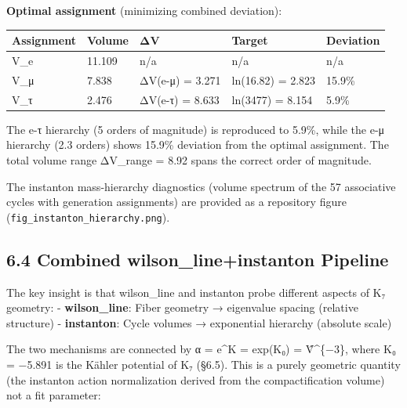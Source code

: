 \documentclass[11pt,a4paper]{article}
\begin{document}
\textbf{Optimal assignment} (minimizing combined deviation):

\begin{longtable}[]{@{}lllll@{}}
\toprule\noalign{}
Assignment & Volume & ΔV & Target & Deviation \\
\midrule\noalign{}
\endhead
\bottomrule\noalign{}
\endlastfoot
V\_\allowbreak{}e & 11.109 & n/a & n/a & n/a \\
V\_\allowbreak{}μ & 7.838 & ΔV(e-μ) = 3.271 & ln(16.82) = 2.823 & 15.9\% \\
V\_\allowbreak{}τ & 2.476 & ΔV(e-τ) = 8.633 & ln(3477) = 8.154 & 5.9\% \\
\end{longtable}

The e-τ hierarchy (5 orders of magnitude) is reproduced to 5.9\%, while the e-μ hierarchy (2.3 orders) shows 15.9\% deviation from the optimal assignment. The total volume range ΔV\_\allowbreak{}range = 8.92 spans the correct order of magnitude.

The instanton mass-hierarchy diagnostics (volume spectrum of the 57 associative cycles with generation assignments) are provided as a repository figure (\texttt{fig\_\allowbreak{}instanton\_\allowbreak{}hierarchy.\allowbreak{}png}).

\subsection{6.4 Combined wilson\_\allowbreak{}line+instanton Pipeline}\label{combined-wilson_lineinstanton-pipeline}

The key insight is that wilson\_\allowbreak{}line and instanton probe different aspects of K₇ geometry: - \textbf{wilson\_\allowbreak{}line}: Fiber geometry → eigenvalue spacing (relative structure) - \textbf{instanton}: Cycle volumes → exponential hierarchy (absolute scale)

The two mechanisms are connected by α = e\^{}K = exp(K₀) = V̂\^{}\{−3\}, where K₀ = −5.891 is the Kähler potential of K₇ (§6.5). This is a purely geometric quantity (the instanton action normalization derived from the compactification volume) not a fit parameter:
\end{document}
